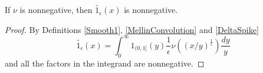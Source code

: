 \begin{lemma}
\label{Smooth1Nonneg}
\leanok
If $\nu$ is nonnegative, then $\widetilde{1_{\epsilon}}(x)$ is nonnegative.
\end{lemma}
\begin{proof}
\leanok
By Definitions \ref{Smooth1}, \ref{MellinConvolution} and \ref{DeltaSpike}
  $$
    \widetilde{1_\epsilon}(x)
    =\int_0^\infty 1_{(0,1]}(y)\frac1\epsilon\nu((x/y)^{\frac1\epsilon}) \frac{dy}y
  $$
  and all the factors in the integrand are nonnegative.
\end{proof}
